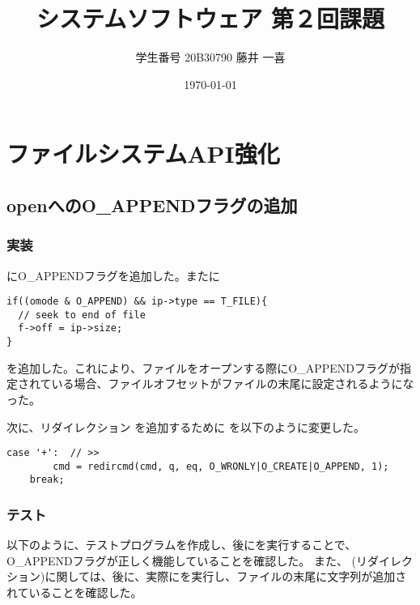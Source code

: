 \documentclass[platex,dvipdfmx, titlepage]{jlreq} %
\title{システムソフトウェア 第２回課題}
\author{学生番号 20B30790 藤井 一喜}
\date{\today}
\begin{document}
\maketitle

\section{ファイルシステムAPI強化}

\subsection{openへのO\_APPENDフラグの追加}

\subsubsection*{実装}

にO\_APPENDフラグを追加した。またに

\begin{lstlisting}[caption={kernel/fcntl.h}]
if((omode & O_APPEND) && ip->type == T_FILE){
  // seek to end of file
  f->off = ip->size;
}
\end{lstlisting}

\noindent を追加した。これにより、ファイルをオープンする際にO\_APPENDフラグが指定されている場合、ファイルオフセットがファイルの末尾に設定されるようになった。

\noindent 次に、リダイレクション \code{>>} を追加するために  を以下のように変更した。

\begin{lstlisting}[caption={user/sh.c}]
    case '+':  // >>
        cmd = redircmd(cmd, q, eq, O_WRONLY|O_CREATE|O_APPEND, 1);
    break;
\end{lstlisting}

\subsubsection*{テスト}

以下のように、テストプログラムを作成し、後にを実行することで、O\_APPENDフラグが正しく機能していることを確認した。
また、\code{>>} (リダイレクション)に関しては、後に、実際にを実行し、ファイルの末尾に文字列が追加されていることを確認した。
\end{document}
